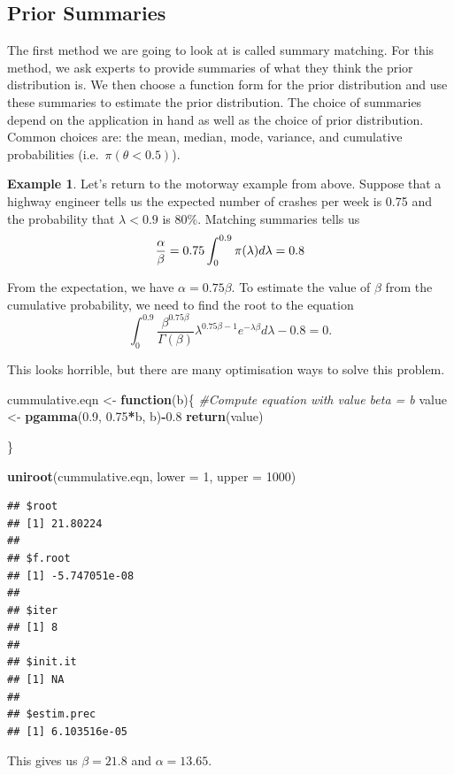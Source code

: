 \documentclass[
]{book}
\newenvironment{Shaded}{\begin{snugshade}}{\end{snugshade}}
\newcommand{\AttributeTok}[1]{\textcolor[rgb]{0.13,0.29,0.53}{#1}}
\newcommand{\CommentTok}[1]{\textcolor[rgb]{0.56,0.35,0.01}{\textit{#1}}}
\newcommand{\ControlFlowTok}[1]{\textcolor[rgb]{0.13,0.29,0.53}{\textbf{#1}}}
\newcommand{\DecValTok}[1]{\textcolor[rgb]{0.00,0.00,0.81}{#1}}
\newcommand{\FloatTok}[1]{\textcolor[rgb]{0.00,0.00,0.81}{#1}}
\newcommand{\FunctionTok}[1]{\textcolor[rgb]{0.13,0.29,0.53}{\textbf{#1}}}
\newcommand{\NormalTok}[1]{#1}
\newcommand{\OtherTok}[1]{\textcolor[rgb]{0.56,0.35,0.01}{#1}}
\newcommand{\SpecialCharTok}[1]{\textcolor[rgb]{0.81,0.36,0.00}{\textbf{#1}}}
\theoremstyle{definition}
\theoremstyle{definition}
\newtheorem{example}{Example}[chapter]
\theoremstyle{definition}
\theoremstyle{definition}
\theoremstyle{remark}
\begin{document}
\subsection{Prior Summaries}\label{prior-summaries}

The first method we are going to look at is called summary matching. For this method, we ask experts to provide summaries of what they think the prior distribution is. We then choose a function form for the prior distribution and use these summaries to estimate the prior distribution. The choice of summaries depend on the application in hand as well as the choice of prior distribution. Common choices are: the mean, median, mode, variance, and cumulative probabilities (i.e.~\(\pi(\theta < 0.5)\)).

\begin{example}
Let's return to the motorway example from above. Suppose that a highway engineer tells us the expected number of crashes per week is 0.75 and the probability that \(\lambda < 0.9\) is 80\%. Matching summaries tells us
\[
\frac{\alpha}{\beta} = 0.75 \\
\int_0^{0.9}\pi(\lambda) d\lambda = 0.8
\]

From the expectation, we have \(\alpha = 0.75\beta\). To estimate the value of \(\beta\) from the cumulative probability, we need to find the root to the equation
\[
\int_0^{0.9} \frac{\beta^{0.75\beta}}{\Gamma(\beta)}\lambda^{0.75\beta-1}e^{-\lambda\beta}d\lambda - 0.8 = 0. 
\]

This looks horrible, but there are many optimisation ways to solve this problem.

\begin{Shaded}
\begin{Highlighting}[]
\NormalTok{cummulative.eqn }\OtherTok{\textless{}{-}} \ControlFlowTok{function}\NormalTok{(b)\{}
  \CommentTok{\#Compute equation with value beta = b}
\NormalTok{  value }\OtherTok{\textless{}{-}} \FunctionTok{pgamma}\NormalTok{(}\FloatTok{0.9}\NormalTok{, }\FloatTok{0.75}\SpecialCharTok{*}\NormalTok{b, b)}\SpecialCharTok{{-}}\FloatTok{0.8}
  \FunctionTok{return}\NormalTok{(value)}
  
\NormalTok{\}}

\FunctionTok{uniroot}\NormalTok{(cummulative.eqn, }\AttributeTok{lower =} \DecValTok{1}\NormalTok{, }\AttributeTok{upper =} \DecValTok{1000}\NormalTok{)}
\end{Highlighting}
\end{Shaded}

\begin{verbatim}
## $root
## [1] 21.80224
## 
## $f.root
## [1] -5.747051e-08
## 
## $iter
## [1] 8
## 
## $init.it
## [1] NA
## 
## $estim.prec
## [1] 6.103516e-05
\end{verbatim}

This gives us \(\beta = 21.8\) and \(\alpha = 13.65\).
\end{example}
\end{document}
